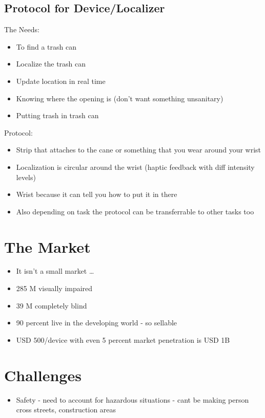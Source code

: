 \documentclass[12pt,letterpaper]{article}
\begin{document}
\subsection*{Protocol for Device/Localizer}
The Needs:
\newline
\begin{itemize}
    \item To find a trash can
    \item Localize the trash can
    \item Update location in real time
    \item Knowing where the opening is (don't want something unsanitary)
    \item Putting trash in trash can
\end{itemize}
Protocol:
\newline
\begin{itemize}
    \item Strip that attaches to the cane or something that you wear around your wrist
    \item Localization is circular around the wrist (haptic feedback with diff intensity levels)
    \item Wrist because it can tell you how to put it in there 
    \item Also depending on task the protocol can be transferrable to other tasks too
\end{itemize}

\section*{The Market}
\begin{itemize}
    \item It isn’t a small market … 
    \item 285 M visually impaired
    \item 39 M completely blind
    \item 90 percent live in the developing world - so sellable
    \item USD 500/device with even 5 percent market penetration is USD 1B
\end{itemize}

\section*{Challenges}
\begin{itemize}
    \item Safety - need to account for hazardous situations - cant be making person cross streets, construction areas
\end{itemize}
\end{document}

